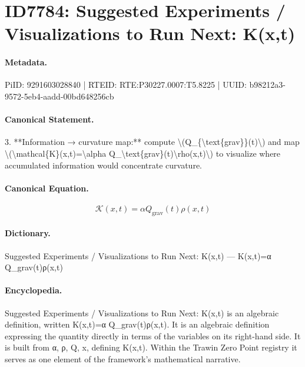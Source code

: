 \section*{ID7784: Suggested Experiments / Visualizations to Run Next: K(x,t)}
\paragraph{Metadata.}
PiID: 9291603028840 | RTEID: RTE:P30227.0007:T5.8225 | UUID: b98212a3-9572-5eb4-aadd-00bd648256cb

\paragraph{Canonical Statement.}
3. **Information → curvature map:** compute \textbackslash{}(Q\_\{\textbackslash{}text\{grav\}\}(t)\textbackslash{}) and map \textbackslash{}(\textbackslash{}mathcal\{K\}(x,t)=\textbackslash{}alpha Q\_\textbackslash{}text\{grav\}(t)\textbackslash{}rho(x,t)\textbackslash{}) to visualize where accumulated information would concentrate curvature.

\paragraph{Canonical Equation.}
\[
\mathcal{K}(x,t)=\alpha Q_\text{grav}(t)\rho(x,t)
\]

\paragraph{Dictionary.}
Suggested Experiments / Visualizations to Run Next: K(x,t) — K(x,t)=α Q\_grav(t)ρ(x,t)

\paragraph{Encyclopedia.}
Suggested Experiments / Visualizations to Run Next: K(x,t) is an algebraic definition, written K(x,t)=α Q\_grav(t)ρ(x,t). It is an algebraic definition expressing the quantity directly in terms of the variables on its right-hand side. It is built from α, ρ, Q, x, defining K(x,t). Within the Trawin Zero Point registry it serves as one element of the framework's mathematical narrative.
